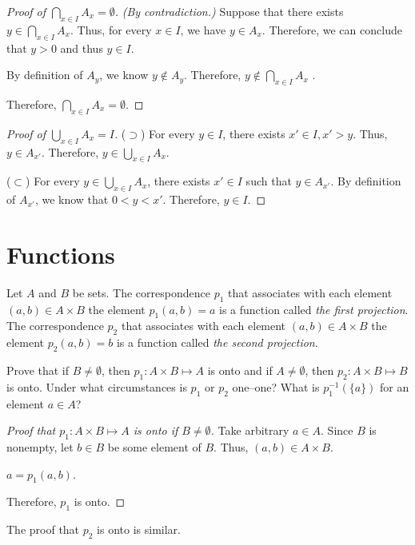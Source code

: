 
\begin{proof}[Proof of $\bigcap_{x \in I} A_x = \emptyset$]
	\textit{(By contradiction.)}
	Suppose that there exists $y \in \bigcap_{x \in I} A_x$.
	Thus, for every $x \in I$, we have $y \in A_x$.
	Therefore, we can conclude that $y > 0$ and thus $y \in I$.

	By definition of $A_y$, we know $y \notin A_y$.
	Therefore, $y \notin \bigcap_{x \in I} A_x$ \contradiction.

	Therefore, $\bigcap_{x \in I} A_x = \emptyset$.
\end{proof}

\begin{proof}[Proof of $\bigcup_{x \in I} A_x = I$]
	($\supset$) For every $y \in I$, there exists $x' \in I, x' > y$. Thus, $y \in A_{x'}$.
	Therefore, $y \in \bigcup_{x \in I} A_x$.

	($\subset$) For every $y \in \bigcup_{x \in I} A_x$, there exists $x' \in I$ such that $y \in A_{x'}$.
	By definition of $A_{x'}$, we know that $0 < y < x'$.
	Therefore, $y \in I$.
\end{proof}



\setcounter{section}{5}
\section{Functions}
\begin{problem}[5]
	Let $A$ and $B$ be sets.
	The correspondence $p_1$ that associates with each element $(a,b) \in A \times B$ the element $p_1(a,b) = a$ is a function called \textit{the first projection}.
	The correspondence $p_2$ that associates with each element $(a,b) \in A \times B$ the element $p_2(a,b) = b$ is a function called \textit{the second projection}.

	Prove that if $B \neq \emptyset$, then $p_1 : A \times B \mapsto A$ is onto and if $A \neq \emptyset$, then $p_2 : A \times B \mapsto B$ is onto.
	Under what circumstances is $p_1$ or $p_2$ one--one?
	What is $p_1^{-1}(\{a\})$ for an element $a \in A$?
\end{problem}


\begin{proof}[Proof that $p_1 : A \times B \mapsto A$ is onto if $B \neq \emptyset$]
	Take arbitrary $a \in A$.
	Since $B$ is nonempty, let $b \in B$ be some element of $B$.
	Thus, $(a,b) \in A \times B$.

	$a = p_1(a,b)$.

	Therefore, $p_1$ is onto.
\end{proof}
The proof that $p_2$ is onto is similar.

